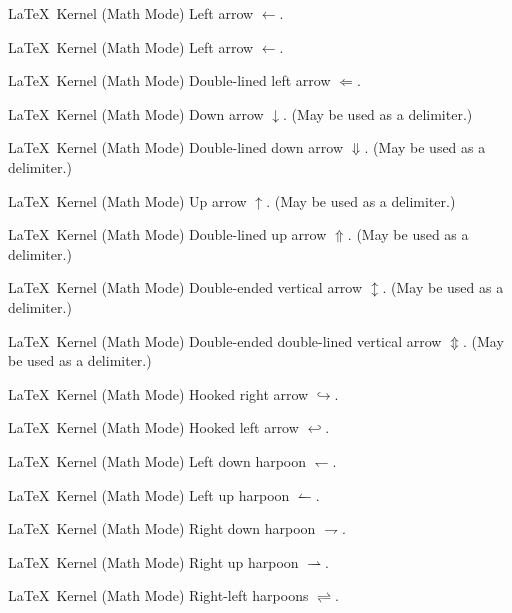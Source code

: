 %
 {}%
 {\LaTeX\ Kernel (Math Mode)}%
 {Left arrow \ensuremath{\leftarrow}.}%
 {}

%
 {}%
 {\LaTeX\ Kernel (Math Mode)}%
 {Left arrow \ensuremath{\gets}.}%
 {}

%
 {}%
 {\LaTeX\ Kernel (Math Mode)}%
 {Double-lined left arrow \ensuremath{\Leftarrow}.}%
 {}

%
 {}%
 {\LaTeX\ Kernel (Math Mode)}%
 {Down arrow \ensuremath{\downarrow}. (May be used as a delimiter.)}%
 {}

%
 {}%
 {\LaTeX\ Kernel (Math Mode)}%
 {Double-lined down arrow \ensuremath{\Downarrow}. (May be used as a delimiter.)}%
 {}

%
 {}%
 {\LaTeX\ Kernel (Math Mode)}%
 {Up arrow \ensuremath{\uparrow}. (May be used as a delimiter.)}%
 {}

%
 {}%
 {\LaTeX\ Kernel (Math Mode)}%
 {Double-lined up arrow \ensuremath{\Uparrow}. (May be used as a delimiter.)}%
 {}

%
 {}%
 {\LaTeX\ Kernel (Math Mode)}%
 {Double-ended vertical arrow \ensuremath{\updownarrow}. (May be used as a delimiter.)}%
 {}

%
 {}%
 {\LaTeX\ Kernel (Math Mode)}%
 {Double-ended double-lined vertical arrow \ensuremath{\Updownarrow}. (May be used as a delimiter.)}%
 {}

%
 {}%
 {\LaTeX\ Kernel (Math Mode)}%
 {Hooked right arrow \ensuremath{\hookrightarrow}.}%
 {}

%
 {}%
 {\LaTeX\ Kernel (Math Mode)}%
 {Hooked left arrow \ensuremath{\hookleftarrow}.}%
 {}

%
 {}%
 {\LaTeX\ Kernel (Math Mode)}%
 {Left down harpoon \ensuremath{\leftharpoondown}.}%
 {}

%
 {}%
 {\LaTeX\ Kernel (Math Mode)}%
 {Left up harpoon \ensuremath{\leftharpoonup}.}%
 {}

%
 {}%
 {\LaTeX\ Kernel (Math Mode)}%
 {Right down harpoon \ensuremath{\rightharpoondown}.}%
 {}

%
 {}%
 {\LaTeX\ Kernel (Math Mode)}%
 {Right up harpoon \ensuremath{\rightharpoonup}.}%
 {}

%
 {}%
 {\LaTeX\ Kernel (Math Mode)}%
 {Right-left harpoons \ensuremath{\rightleftharpoons}.}%
 {}

